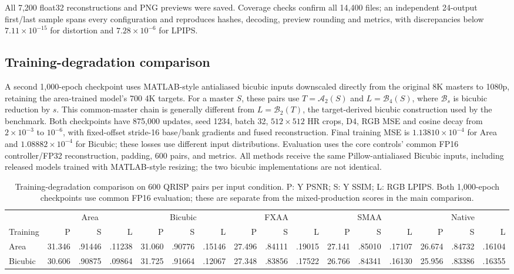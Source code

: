 \documentclass[10pt,twocolumn,letterpaper]{article}
\newcommand{\A}{\mathcal{A}}
\begin{document}
All 7,200 float32 reconstructions and PNG previews were saved.
Coverage checks confirm all 14,400 files; an independent 24-output first/last sample spans every configuration and reproduces hashes, decoding, preview rounding and metrics, with discrepancies below $7.11\times10^{-15}$ for distortion and $7.28\times10^{-6}$ for LPIPS.

\subsection{Training-degradation comparison}
\label{sec:training-degradation}
A second 1,000-epoch checkpoint uses MATLAB-style antialiased bicubic inputs downscaled directly from the original 8K masters to 1080p, retaining the area-trained model's 700 4K targets.
For a master $S$, these pairs use $T=\A_2(S)$ and $L=\mathcal B_4(S)$, where $\mathcal B_s$ is bicubic reduction by $s$.
This common-master chain is generally different from $L=\mathcal B_2(T)$, the target-derived bicubic construction used by the benchmark.
Both checkpoints have 875,000 updates, seed 1234, batch 32, $512\times512$ HR crops, D4, RGB MSE and cosine decay from $2\times10^{-3}$ to $10^{-6}$, with fixed-offset stride-16 base/bank gradients and fused reconstruction.
Final training MSE is $1.13810\times10^{-4}$ for Area and $1.08882\times10^{-4}$ for Bicubic; these losses use different input distributions.
Evaluation uses the core controls' common FP16 controller/FP32 reconstruction, padding, 600 pairs, and metrics.
All methods receive the same Pillow-antialiased Bicubic inputs, including released models trained with MATLAB-style resizing; the two bicubic implementations are not identical.

\begin{table}[t]
\centering\footnotesize
\setlength{\tabcolsep}{2.5pt}
\caption{Training-degradation comparison on 600 QRISP pairs per input condition. P: Y PSNR; S: Y SSIM; L: RGB LPIPS. Both 1,000-epoch checkpoints use common FP16 evaluation; these are separate from the mixed-production scores in the main comparison.}
\label{tab:training-degradation}
\begin{tabular}{l*{15}{r}}
\toprule
 & \multicolumn{3}{c}{Area} & \multicolumn{3}{c}{Bicubic} & \multicolumn{3}{c}{FXAA} & \multicolumn{3}{c}{SMAA} & \multicolumn{3}{c}{Native}\\
Training & P & S & L & P & S & L & P & S & L & P & S & L & P & S & L\\
\midrule
Area &31.346&.91446&.11238&31.060&.90776&.15146&27.496&.84111&.19015&27.141&.85010&.17107&26.674&.84732&.16104\\
Bicubic &30.606&.90875&.09864&31.725&.91664&.12067&27.348&.83856&.17522&26.766&.84341&.16130&25.956&.83386&.16355\\
\bottomrule
\end{tabular}
\end{table}
\end{document}
